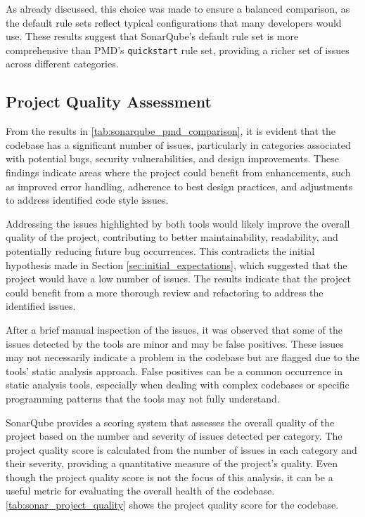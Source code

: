 As already discussed, this choice was made to ensure a balanced comparison, as the default rule sets reflect typical configurations that many developers would use. These results suggest that SonarQube’s default rule set is more comprehensive than PMD’s \texttt{quickstart} rule set, providing a richer set of issues across different categories.

\subsection{Project Quality Assessment}

From the results in \autoref{tab:sonarqube_pmd_comparison}, it is evident that the codebase has a significant number of issues, particularly in categories associated with potential bugs, security vulnerabilities, and design improvements. These findings indicate areas where the project could benefit from enhancements, such as improved error handling, adherence to best design practices, and adjustments to address identified code style issues.

Addressing the issues highlighted by both tools would likely improve the overall quality of the project, contributing to better maintainability, readability, and potentially reducing future bug occurrences. This contradicts the initial hypothesis made in Section \ref{sec:initial_expectations}, which suggested that the project would have a low number of issues. The results indicate that the project could benefit from a more thorough review and refactoring to address the identified issues.

After a brief manual inspection of the issues, it was observed that some of the issues detected by the tools are minor and may be false positives. These issues may not necessarily indicate a problem in the codebase but are flagged due to the tools' static analysis approach. False positives can be a common occurrence in static analysis tools, especially when dealing with complex codebases or specific programming patterns that the tools may not fully understand.

SonarQube provides a scoring system that assesses the overall quality of the project based on the number and severity of issues detected per category. The project quality score is calculated from the number of issues in each category and their severity, providing a quantitative measure of the project's quality. Even though the project quality score is not the focus of this analysis, it can be a useful metric for evaluating the overall health of the codebase. \autoref{tab:sonar_project_quality} shows the project quality score for the codebase.

